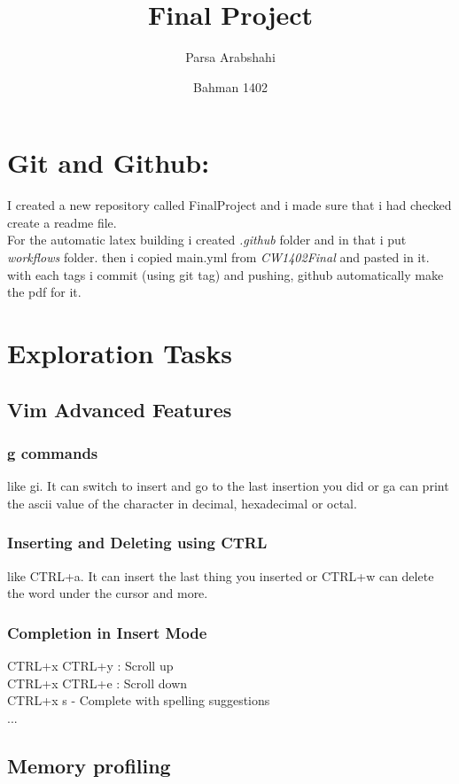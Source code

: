 \documentclass{article}
\title{
    \vspace{2in}
    \textbf{Final Project}\\
    \vspace{2in}
}
\author{Parsa Arabshahi }
\date{Bahman 1402}
\begin{document}
\begin{titlepage}
\maketitle
\end{titlepage}
\newpage
{}
\tableofcontents
\newpage
\section{Git and Github:}
I created a new repository called FinalProject and i made sure that i had checked create a readme file.\\
For the automatic latex building i created \textit{.github} folder and in that i put \textit{workflows} folder. then i copied main.yml from \textit{CW1402Final} and pasted in it.\\
with each tags i commit (using git tag) and pushing, github automatically make the pdf for it.
\fancyhead[R]{}
\section{Exploration Tasks}
\subsection{Vim Advanced Features}
\subsubsection{g commands}
like gi. It can switch to insert and go to the last insertion you did or ga can print the ascii value of the character in decimal, hexadecimal or octal.
\subsubsection{Inserting and Deleting using CTRL}
like CTRL+a. It can insert the last thing you inserted or CTRL+w can delete the word under the cursor and more.
\subsubsection{Completion in Insert Mode}
CTRL+x CTRL+y : Scroll up\\
CTRL+x CTRL+e : Scroll down\\
CTRL+x s - Complete with spelling suggestions\\
...
\subsection{Memory profiling}
\end{document}
